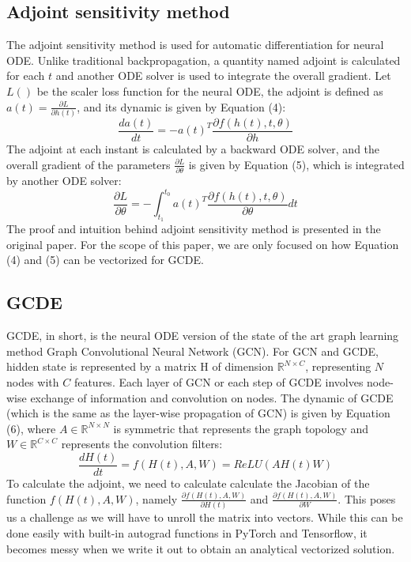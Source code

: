 \documentclass{article}
\begin{document}
\subsection{Adjoint sensitivity method}
The adjoint sensitivity method is used for automatic differentiation for neural ODE. Unlike traditional backpropagation, a quantity named adjoint is calculated for each $t$ and another ODE solver is used to integrate the overall gradient. Let $L()$ be the scaler loss function for the neural ODE, the adjoint is defined as $a(t) = \frac{\partial L}{\partial h(t)}$, and its dynamic is given by Equation (4):
\begin{equation}
\frac{da(t)}{dt} = -a(t)^{T}\frac{\partial f(h(t), t, \theta)}{\partial h}
\end{equation}
The adjoint at each instant is calculated by a backward ODE solver, and the overall gradient of the parameters $\frac{\partial L}{\partial \theta}$ is given by Equation (5), which is integrated by another ODE solver:
\begin{equation}
\frac{\partial L}{\partial \theta} = -\int_{t_{1}}^{t_{0}} a(t)^{T}\frac{\partial f(h(t), t, \theta)}{\partial \theta}dt
\end{equation}
The proof and intuition behind adjoint sensitivity method is presented in the original paper. For the scope of this paper, we are only focused on how Equation (4) and (5) can be vectorized for GCDE. 

\subsection{GCDE}
GCDE, in short, is the neural ODE version of the state of the art graph learning method Graph Convolutional Neural Network (GCN). For GCN and GCDE, hidden state is represented by a matrix H of dimension $\mathbb{R}^{N\times C}$, representing $N$ nodes with $C$ features. Each layer of GCN or each step of GCDE involves node-wise exchange of information and convolution on nodes. The dynamic of GCDE (which is the same as the layer-wise propagation of GCN) is given by Equation (6), where $A\in\mathbb{R}^{N\times N}$ is symmetric that represents the graph topology and $W\in\mathbb{R}^{C\times C}$ represents the convolution filters:
\begin{equation}
\frac{dH(t)}{dt} = f(H(t), A, W) = ReLU(AH(t)W)
\end{equation}
To calculate the adjoint, we need to calculate calculate the Jacobian of the function $f(H(t), A, W)$, namely $\frac{\partial f(H(t), A, W)}{\partial H(t)}$ and $\frac{\partial f(H(t), A, W)}{\partial W}$. This poses us a challenge as we will have to unroll the matrix into vectors. While this can be done easily with built-in autograd functions in PyTorch and Tensorflow, it becomes messy when we write it out to obtain an analytical vectorized solution. 
\end{document}
